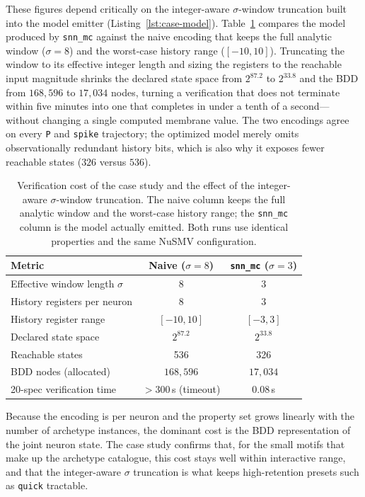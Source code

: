 \documentclass[
]{ceurart}
\begin{document}
These figures depend critically on the integer-aware $\sigma$-window truncation built into
the model emitter (Listing~\ref{lst:case-model}). Table~\ref{tab:case-eval} compares the
model produced by \texttt{snn\_mc} against the naive encoding that keeps the full analytic
window ($\sigma = 8$) and the worst-case history range ($[-10,10]$). Truncating the window
to its effective integer length and sizing the registers to the reachable input magnitude
shrinks the declared state space from $2^{87.2}$ to $2^{33.8}$ and the BDD from $168{,}596$
to $17{,}034$ nodes, turning a verification that does not terminate within five minutes into
one that completes in under a tenth of a second---without changing a single computed
membrane value. The two encodings agree on every \texttt{P} and \texttt{spike} trajectory;
the optimized model merely omits observationally redundant history bits, which is also why
it exposes fewer reachable states ($326$ versus $536$).

\begin{table}
\centering
\caption{Verification cost of the case study and the effect of the integer-aware $\sigma$-window truncation. The naive column keeps the full analytic window and the worst-case history range; the \texttt{snn\_mc} column is the model actually emitted. Both runs use identical properties and the same NuSMV configuration.}
\label{tab:case-eval}
\small
\begin{tabular}{@{}lcc@{}}
\toprule
\textbf{Metric} & \textbf{Naive ($\sigma{=}8$)} & \textbf{\texttt{snn\_mc} ($\sigma{=}3$)} \\
\midrule
Effective window length $\sigma$        & 8            & 3 \\
History registers per neuron            & 8            & 3 \\
History register range                  & $[-10,10]$   & $[-3,3]$ \\
Declared state space                    & $2^{87.2}$   & $2^{33.8}$ \\
Reachable states                        & 536          & 326 \\
BDD nodes (allocated)                    & $168{,}596$  & $17{,}034$ \\
20-spec verification time               & $>300$\,s (timeout) & $0.08$\,s \\
\bottomrule
\end{tabular}
\end{table}

Because the encoding is per neuron and the property set grows linearly with the number of
archetype instances, the dominant cost is the BDD representation of the joint neuron state.
The case study confirms that, for the small motifs that make up the archetype catalogue,
this cost stays well within interactive range, and that the integer-aware $\sigma$
truncation is what keeps high-retention presets such as \texttt{quick} tractable.
\end{document}
